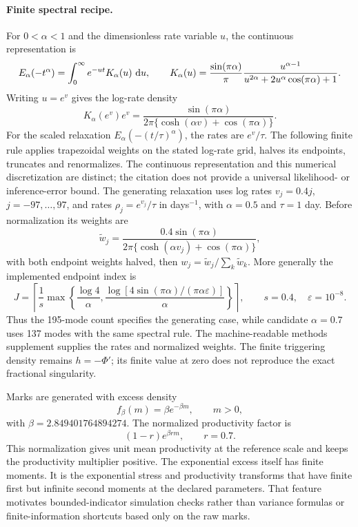 \paragraph{Finite spectral recipe.}
For \(0<\alpha<1\) and the dimensionless rate variable $u$, the continuous representation
\citep[Eqs.~(2.12)--(2.13)]{Mainardi2014} is
\[
 E_\alpha(-t^\alpha)=\int_0^\infty e^{-ut}K_\alpha(u)\,\mathop{}\!\mathrm{d} u,
 \qquad
 K_\alpha(u)=\frac{\sin(\pi\alpha)}{\pi}
 \frac{u^{\alpha-1}}{u^{2\alpha}+2u^\alpha\cos(\pi\alpha)+1}.
\]
Writing $u=e^v$ gives the log-rate density
\[
 K_\alpha(e^v)e^v=
 \frac{\sin(\pi\alpha)}{2\pi\{\cosh(\alpha v)+\cos(\pi\alpha)\}}.
\]
For the scaled relaxation $E_\alpha(-(t/\tau)^\alpha)$, the rates are
$e^v/\tau$. The following finite rule applies trapezoidal weights on the
stated log-rate grid, halves its endpoints, truncates and renormalizes.
The continuous representation and this numerical discretization are distinct;
the citation does not provide a universal likelihood- or inference-error bound.
The generating relaxation uses log rates \(v_j=0.4j\), \(j=-97,\ldots,97\), and rates \(\rho_j=e^{v_j}/\tau\) in days\(^{-1}\), with \(\alpha=0.5\) and \(\tau=1\) day. Before normalization its weights are
\[
 \widetilde w_j=\frac{0.4\sin(\pi\alpha)}{2\pi\{\cosh(\alpha v_j)+\cos(\pi\alpha)\}},
\]
with both endpoint weights halved, then \(w_j=\widetilde w_j/\sum_k\widetilde w_k\). More generally the implemented endpoint index is
\[
 J=\left\lceil\frac{1}{s}\max\left\{\frac{\log4}{\alpha},
 \frac{\log[4\sin(\pi\alpha)/(\pi\alpha\varepsilon)]}{\alpha}\right\}\right\rceil,
 \qquad s=0.4,\quad\varepsilon=10^{-8}.
\]
Thus the 195-mode count specifies the generating case, while candidate \(\alpha=0.7\) uses 137 modes with the same spectral rule. The machine-readable methods supplement supplies the rates and normalized weights. The finite triggering density remains \(h=-\Phi'\); its finite value at zero does not reproduce the exact fractional singularity.


Marks are generated with excess density
\[
f_\beta(m)=\beta e^{-\beta m},\qquad m>0,
\]
with \(\beta=2.849401764894274\). The normalized productivity factor is
\[
(1-r)e^{\beta r m},\qquad r=0.7.
\]
This normalization gives unit mean productivity at the reference scale and keeps the productivity multiplier positive. The exponential excess itself has finite moments. It is the exponential stress and productivity transforms that have finite first but infinite second moments at the declared parameters. That feature motivates bounded-indicator simulation checks rather than variance formulas or finite-information shortcuts based only on the raw marks.

